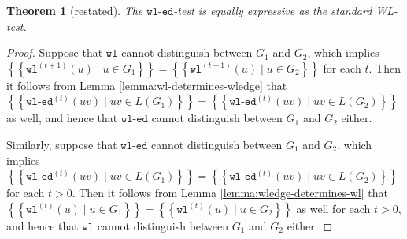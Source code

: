 \documentclass{article}
\newtheorem{theorem}{Theorem}
\newcommand{\multiset}[1]{\left\{\!\!\left\{#1\right\}\!\!\right\}}
\newcommand{\iter}[1]{^{(#1)}}
\newcommand{\wl}{\texttt{wl}}
\newcommand{\wledge}{\texttt{wl-ed}}
\begin{document}
\begingroup
\def\thetheorem{\ref{thm:wledge-equal-to-wl}}
\begin{theorem}[restated]
    The $\wledge$-test is equally expressive as the standard WL-test.
\end{theorem}
\addtocounter{theorem}{-1}
\endgroup

\begin{proof}
    Suppose that $\wl$ cannot distinguish between $G_1$ and $G_2$, which implies $\multiset{\wl\iter{t+1}(u) \mid u\in G_1} = \multiset{\wl\iter{t+1}(u) \mid u\in G_2}$ for each $t$.
    Then it follows from Lemma \ref{lemma:wl-determines-wledge} that $\multiset{\wledge\iter{t}(uv) \mid uv\in L(G_1)} = \multiset{\wledge\iter{t}(uv) \mid uv\in L(G_2)}$ as well, and hence that $\wledge$ cannot distinguish between $G_1$ and $G_2$ either.

    Similarly, suppose that $\wledge$ cannot distinguish between $G_1$ and $G_2$, which implies $\multiset{\wledge\iter{t}(uv) \mid uv\in L(G_1)} = \multiset{\wledge\iter{t}(uv) \mid uv\in L(G_2)}$ for each $t>0$.
    Then it follows from Lemma \ref{lemma:wledge-determines-wl} that $\multiset{\wl\iter{t}(u) \mid u\in G_1} = \multiset{\wl\iter{t}(u) \mid u\in G_2}$ as well for each $t>0$, and hence that $\wl$ cannot distinguish between $G_1$ and $G_2$ either.
\end{proof}
\end{document}
